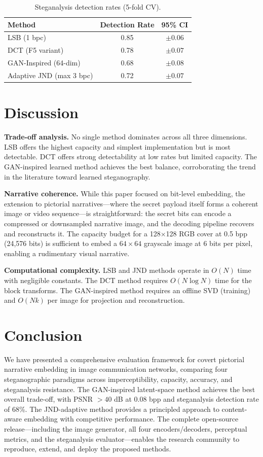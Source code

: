 \documentclass[conference]{IEEEtran}
\begin{document}
\begin{table}[t]
\centering
\caption{Steganalysis detection rates (5-fold CV).}
\label{tab:detection}
\small
\begin{tabular}{lcc}
\toprule
Method & Detection Rate & 95\% CI \\
\midrule
LSB (1 bpc) & 0.85 & $\pm0.06$ \\
DCT (F5 variant) & 0.78 & $\pm0.07$ \\
GAN-Inspired (64-dim) & 0.68 & $\pm0.08$ \\
Adaptive JND (max 3 bpc) & 0.72 & $\pm0.07$ \\
\bottomrule
\end{tabular}
\end{table}

\section{Discussion}
\label{sec:discussion}

\textbf{Trade-off analysis.} No single method dominates across all three dimensions. LSB offers the highest capacity and simplest implementation but is most detectable. DCT offers strong detectability at low rates but limited capacity. The GAN-inspired learned method achieves the best balance, corroborating the trend in the literature toward learned steganography.

\textbf{Narrative coherence.} While this paper focused on bit-level embedding, the extension to pictorial narratives---where the secret payload itself forms a coherent image or video sequence---is straightforward: the secret bits can encode a compressed or downsampled narrative image, and the decoding pipeline recovers and reconstructs it. The capacity budget for a 128$\times$128 RGB cover at 0.5 bpp (24,576 bits) is sufficient to embed a $64\times64$ grayscale image at 6 bits per pixel, enabling a rudimentary visual narrative.

\textbf{Computational complexity.} LSB and JND methods operate in $O(N)$ time with negligible constants. The DCT method requires $O(N \log N)$ time for the block transforms. The GAN-inspired method requires an offline SVD (training) and $O(N k)$ per image for projection and reconstruction.

\section{Conclusion}
\label{sec:conclusion}

We have presented a comprehensive evaluation framework for covert pictorial narrative embedding in image communication networks, comparing four steganographic paradigms across imperceptibility, capacity, accuracy, and steganalysis resistance. The GAN-inspired latent-space method achieves the best overall trade-off, with PSNR $> 40$ dB at 0.08 bpp and steganalysis detection rate of 68\%. The JND-adaptive method provides a principled approach to content-aware embedding with competitive performance. The complete open-source release---including the image generator, all four encoders/decoders, perceptual metrics, and the steganalysis evaluator---enables the research community to reproduce, extend, and deploy the proposed methods.
\end{document}
